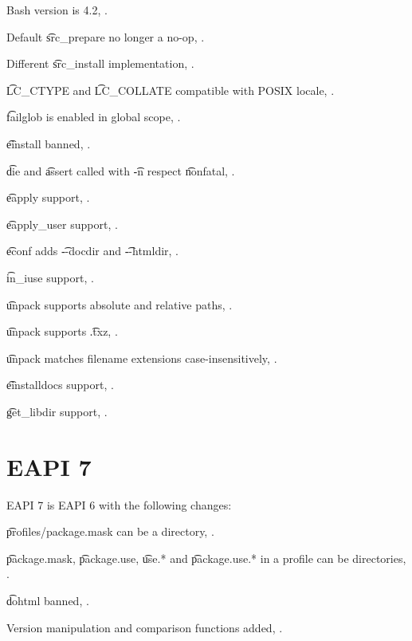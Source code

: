 \begin{compactitem}
\item Bash version is 4.2, .
\item Default \t{src_prepare} no longer a no-op, .
\item Different \t{src_install} implementation, .
\item \t{LC_CTYPE} and \t{LC_COLLATE} compatible with POSIX locale, .
\item \t{failglob} is enabled in global scope, .
\item \t{einstall} banned, .
\item \t{die} and \t{assert} called with \t{-n} respect \t{nonfatal}, .
\item \t{eapply} support, .
\item \t{eapply_user} support, .
\item \t{econf} adds \t{-{}-docdir} and \t{-{}-htmldir}, .
\item \t{in_iuse} support, .
\item \t{unpack} supports absolute and relative paths, .
\item \t{unpack} supports \t{.txz}, .
\item \t{unpack} matches filename extensions case-insensitively, .
\item \t{einstalldocs} support, .
\item \t{get_libdir} support, .
\end{compactitem}

\section{EAPI 7}

EAPI 7 is EAPI 6 with the following changes:

\begin{compactitem}
\item \t{profiles/package.mask} can be a directory, .
\item \t{package.mask}, \t{package.use}, \t{use.*} and \t{package.use.*} in a profile can be
    directories, .
\item \t{dohtml} banned, .
\item Version manipulation and comparison functions added, .
\end{compactitem}



